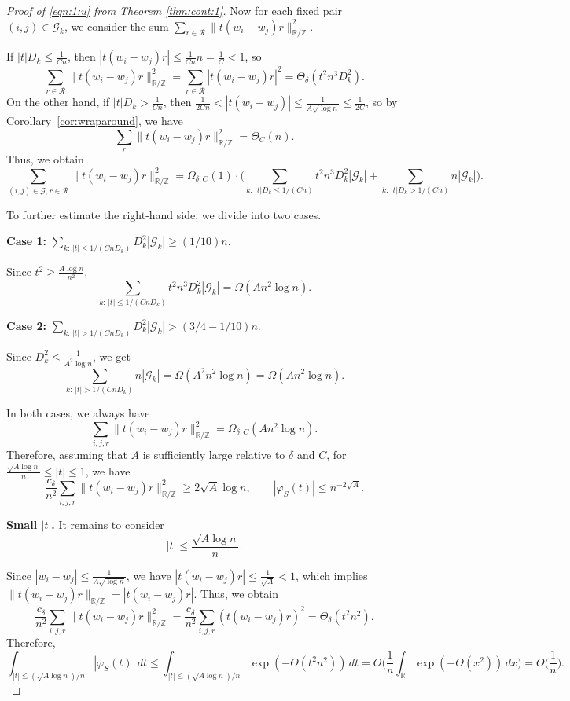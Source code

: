 \documentclass[reqno]{amsart}
\newcommand\R{{\mathbb{R}}}
\newcommand\Z{{\mathbb{Z}}}
\newcommand\CG{{\mathcal G}}
\newcommand\CR{{\mathcal R}}
\theoremstyle{plain}
\theoremstyle{definition}
\begin{document}
\begin{proof}[Proof of \eqref{eqn:1:u} from Theorem \ref{thm:cont:1}]
Now for each fixed pair $(i,j)\in \CG_{k}$, we consider 
the sum $\sum_{r\in \CR} \| t (w_{i} - w_{j}) r \|_{\R/\Z}^{2}$.

If $|t|D_{k} \le \frac{1}{Cn}$, then $|t (w_{i} - w_{j}) r|\le \frac{1}{Cn}n=\tfrac{1}{C}<1$, so 
\[
\sum_{r \in \CR} \| t (w_{i} - w_{j}) r \|_{\R/\Z}^{2} = \sum_{r\in \CR} |t (w_{i} - w_{j}) r|^{2} =\Theta_{\delta}(t^{2} n^{3} D_k^{2}).
\]
On the other hand, if $|t|D_{k}>\frac{1}{Cn}$, then $\tfrac{1}{2Cn}< |t(w_i-w_j)| \le \frac{1}{A\sqrt{\log n}} \le \frac{1}{2C}$, so by Corollary~\ref{cor:wraparound}, we have
\[
\sum_{r} \| t (w_{i} - w_{j}) r \|_{\R/\Z}^{2} =\Theta_{C}(n).
\]
Thus, we obtain
\[
\sum_{(i,j)\in \CG,r\in \CR} \| t (w_{i} - w_{j}) r \|_{\R/\Z}^{2} =\Omega_{\delta, C}(1)\cdot \Big(\sum_{k:\, |t|D_{k} \le 1/(Cn)} t^{2} n^{3} D_{k}^{2} |\CG_{k}| + \sum_{k:\, |t|D_{k}  > 1/(Cn)} n |\CG_{k}|\Big).
\]

To further estimate the right-hand side, we divide into two cases.

{\bf Case 1:} $\sum_{k:\, |t| \le 1/(CnD_{k})} D_{k}^{2} |\CG_{k}| \ge (1/10)n$. 

Since $t^2 \ge \frac{A \log n}{n^2}$,
\[
\sum_{k:\, |t| \le 1/(CnD_{k})} t^{2} n^{3} D_{k}^{2} |\CG_{k}|=\Omega(A n^{2} \log n).
\]

{\bf Case 2:} $\sum_{k:\, |t| > 1/(CnD_{k})} D_{k}^{2} |\CG_{k}| > (3/4 - 1/10) n$. 

Since $D^2_{k} \le \frac{1}{A^2 \log n}$, we get
\[
\sum_{k:\, |t| > 1/(CnD_{k})} n|\CG_{k}| =\Omega(A^{2} n^{2} \log n) =\Omega(A n^{2}\log n).
\]

In both cases, we always have
\[
\sum_{i,j,r} \| t (w_{i} - w_{j}) r \|_{\R/\Z}^{2} =\Omega_{\delta,C}(A n^{2} \log n).
\]
Therefore, assuming that $A$ is sufficiently large relative to $\delta$ and $C$, for $\frac{\sqrt{A\log n}}{n} \le |t| \le 1$, we have
\begin{equation}\label{eqn:phiS:larget} 
\frac{c_{\delta}}{n^{2}}\sum_{i,j,r} \| t (w_{i} - w_{j}) r \|_{\R/\Z}^{2} \ge 2\sqrt{A} \log n, \qquad |\varphi_{S}(t)| \le n^{-2\sqrt{A}}.
\end{equation}

\underline{\bf Small $|t|$.} It remains to consider 
\[
|t| \le \frac{\sqrt{A\log n}}{n}.
\]

Since $|w_{i} - w_{j}| \le \frac{1}{A \sqrt{\log n}}$, we have $|t(w_{i}-w_{j})r| \le \frac{1}{\sqrt{A}}<1$, which implies $\| t (w_{i} - w_{j}) r \|_{\R/\Z} = | t (w_{i} - w_{j}) r |$.
Thus, we obtain
\[
\frac{c_{\delta}}{n^{2}} \sum_{i,j,r} \| t (w_{i} - w_{j}) r \|_{\R/\Z}^{2} 
= \frac{c_{\delta}}{n^{2}} \sum_{i,j,r}(t (w_{i} - w_{j}) r)^{2} =\Theta_{\delta}(t^{2} n^{2}).
\]
Therefore,
\[
\int_{|t| \le (\sqrt{A\log n})/ n} |\varphi_{S}(t)| \, dt \le \int_{|t| \le (\sqrt{A\log n})/ n} \exp(-\Theta(t^{2} n^{2})) \, dt 
=O\Big(\frac{1}{n} \int_{\R} \exp(-\Theta(x^{2})) \, dx\Big) 
=O\Big(\frac{1}{n}\Big).
\]
\end{proof}
\end{document}

